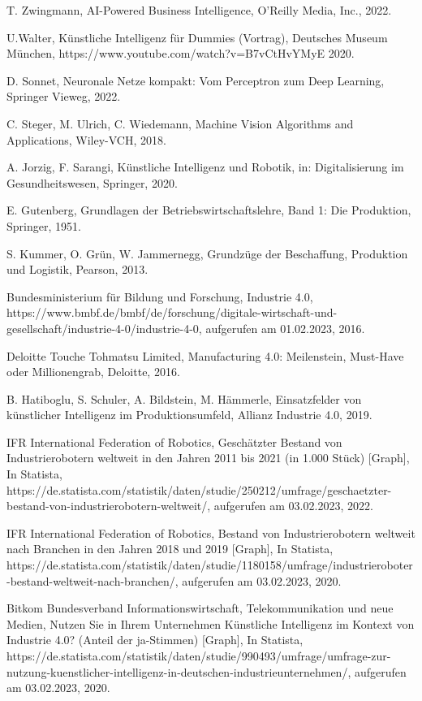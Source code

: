 \begin{thebibliography}{99}
	T. Zwingmann,
	AI-Powered Business Intelligence,
	O'Reilly Media, Inc.,
	2022.

	U.Walter,
	Künstliche Intelligenz für Dummies (Vortrag),
	Deutsches Museum München,
	https://www.youtube.com/watch?v=B7vCtHvYMyE
	2020.

	D. Sonnet,
	Neuronale Netze kompakt: Vom Perceptron zum Deep Learning,
	Springer Vieweg,
	2022.

	C. Steger, M. Ulrich, C. Wiedemann,
	Machine Vision Algorithms and Applications,
	Wiley-VCH,
	2018.

	A. Jorzig, F. Sarangi,
	Künstliche Intelligenz und Robotik, 
	in: Digitalisierung im Gesundheitswesen,
	Springer,
	2020.

	E. Gutenberg,
	Grundlagen der Betriebswirtschaftslehre, Band 1: Die Produktion,
	Springer,
	1951.

	S. Kummer, O. Grün, W. Jammernegg,
	Grundzüge der Beschaffung, Produktion und Logistik,
	Pearson,
	2013.

	Bundesministerium für Bildung und Forschung,
	Industrie 4.0,
	https://www.bmbf.de/bmbf/de/forschung/digitale-wirtschaft-und-gesellschaft/industrie-4-0/industrie-4-0,
	aufgerufen am 01.02.2023,
	2016.

	Deloitte Touche Tohmatsu Limited,
	Manufacturing 4.0: Meilenstein, Must-Have oder Millionengrab,
	Deloitte,
	2016.

	B. Hatiboglu, S. Schuler, A. Bildstein, M. Hämmerle, 
	Einsatzfelder von künstlicher Intelligenz im Produktionsumfeld,
	Allianz Industrie 4.0, 
	2019.

	IFR International Federation of Robotics,
	Geschätzter Bestand von Industrierobotern weltweit in den Jahren 2011 bis 2021 (in 1.000 Stück) [Graph],
	In Statista,
	https://de.statista.com/statistik/daten/studie/250212/umfrage/geschaetzter-bestand-von-industrierobotern-weltweit/,
	aufgerufen am 03.02.2023,
	2022.

	IFR International Federation of Robotics,
	Bestand von Industrierobotern weltweit nach Branchen in den Jahren 2018 und 2019 [Graph],
	In Statista,
	https://de.statista.com/statistik/daten/studie/1180158/umfrage/industrieroboter-bestand-weltweit-nach-branchen/,
	aufgerufen am 03.02.2023,
	2020.

	Bitkom Bundesverband Informationswirtschaft, Telekommunikation und neue Medien,
	Nutzen Sie in Ihrem Unternehmen Künstliche Intelligenz im Kontext von Industrie 4.0? (Anteil der ja-Stimmen) [Graph],
	In Statista,
	https://de.statista.com/statistik/daten/studie/990493/umfrage/umfrage-zur-nutzung-kuenstlicher-intelligenz-in-deutschen-industrieunternehmen/,
	aufgerufen am 03.02.2023,
	2020.


\end{thebibliography}
